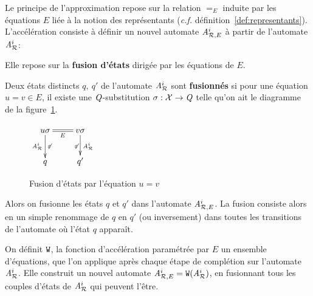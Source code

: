 Le principe de l'approximation repose sur la relation $=_E$ induite par les équations $E$ liée
à la notion des représentants (\textit{c.f.} définition~\ref{def:representants}). 
L'accélération consiste à définir un nouvel automate ${\mathit A}_{\mathcal R,E}^i$ à partir de l'automate ${\mathit A}_{\mathcal R}^i$:

Elle repose sur la \textbf{fusion d'états} dirigée par les équations de $E$.
\begin{definition}
  Deux états distincts $q,\ q'$ de l'automate ${\mathit A}_{\mathcal R}^i$ sont \textbf{fusionnés} si pour une équation $u=v \in E$,
  il existe une $\mathit Q$-substitution $\sigma : \mathcal X \rightarrow \mathit Q$ telle qu'on ait le diagramme de la figure~\ref{fig:fusion}.

  \begin{figure}[ht!]
    \centering
    $\xymatrix{
      u\sigma \ar@{=}[r]_{E}\ar[d]_{\aaex^i}^{\not\varepsilon} & v\sigma \ar[d]_{\not\varepsilon}^{\aaex^i}\\
      q & q'
    } $
    \caption{Fusion d'états par l'équation $u=v$}
    \label{fig:fusion}
  \end{figure}

  Alors on fusionne les états $q$ et $q'$ dans l'automate ${\mathit A}_{\mathcal R,E}^i$. 
  La fusion consiste alors en un simple renommage de $q$ en $q'$ (ou inversement) dans toutes
  les transitions de l'automate où l'état $q$ apparaît.
\end{definition}


\begin{definition}
  On définit $\mathtt{W}$, la fonction d'accélération paramétrée par $E$ un ensemble d'équations, 
  que l'on applique après chaque étape de complétion sur l'automate ${\mathit A}_{\mathcal R}^i$. Elle construit
  un nouvel automate ${\mathit A}_{\mathcal R,E}^i = \mathtt{W}({\mathit A}_{\mathcal R}^i)$, en fusionnant tous les couples d'états de ${\mathit A}_{\mathcal R}^i$
  qui peuvent l'être.
\end{definition}


